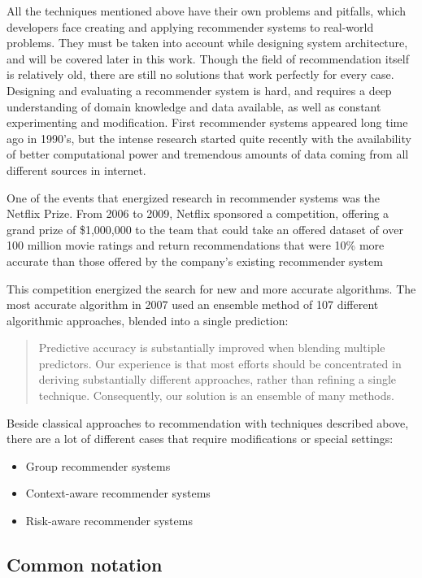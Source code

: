 \documentclass[11pt]{article}
\providecommand{\tightlist}{%
      \setlength{\itemsep}{0pt}\setlength{\parskip}{0pt}}
\begin{document}
    All the techniques mentioned above have their own problems and pitfalls,
which developers face creating and applying recommender systems to
real-world problems. They must be taken into account while designing
system architecture, and will be covered later in this work. Though the
field of recommendation itself is relatively old, there are still no
solutions that work perfectly for every case. Designing and evaluating a
recommender system is hard, and requires a deep understanding of domain
knowledge and data available, as well as constant experimenting and
modification. First recommender systems appeared long time ago in
1990's, but the intense research started quite recently with the
availability of better computational power and tremendous amounts of
data coming from all different sources in internet.

    One of the events that energized research in recommender systems was the
Netflix Prize. From 2006 to 2009, Netflix sponsored a competition,
offering a grand prize of \$1,000,000 to the team that could take an
offered dataset of over 100 million movie ratings and return
recommendations that were 10\% more accurate than those offered by the
company's existing recommender system

This competition energized the search for new and more accurate
algorithms. The most accurate algorithm in 2007 used an ensemble method
of 107 different algorithmic approaches, blended into a single
prediction:

\begin{quote}
Predictive accuracy is substantially improved when blending multiple
predictors. Our experience is that most efforts should be concentrated
in deriving substantially different approaches, rather than refining a
single technique. Consequently, our solution is an ensemble of many
methods.
\end{quote}

    Beside classical approaches to recommendation with techniques described
above, there are a lot of different cases that require modifications or
special settings:

\begin{itemize}
\tightlist
\item
  Group recommender systems
\item
  Context-aware recommender systems
\item
  Risk-aware recommender systems
\end{itemize}

    \subsection{Common notation}\label{common-notation}
\end{document}
